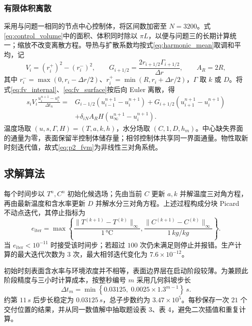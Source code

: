 \documentclass[withoutpreface,bwprint]{cumcmthesis}
\begin{document}
\subsubsection{有限体积离散}

采用与问题一相同的节点中心控制体，将区间数加密至 $N=3200$。式\eqref{eq:control_volume}中的面积、体积同时除以 $\pi L$，以便与问题三的长期计算统一；缩放不改变离散方程。导热与扩散系数均按式\eqref{eq:harmonic_mean}取调和平均，记
\begin{equation}
V_i=(r_i^+)^2-(r_i^-)^2,\qquad
G_{i+1/2}=\frac{2r_{i+1/2}\Gamma_{i+1/2}}{\Delta r},\qquad A_R=2R,
\label{eq:p2_scaled_geometry}
\end{equation}
其中 $r_i^-=\max(0,r_i-\Delta r/2)$、$r_i^+=\min(R,r_i+\Delta r/2)$，$\Gamma$ 取 $k$ 或 $D$。将式\eqref{eq:fv_internal}、\eqref{eq:fv_surface}按后向 Euler 离散，得
\begin{equation}
\begin{aligned}
s_iV_i\frac{u_i^{n+1}-u_i^n}{\Delta t_n}
={}&G_{i-1/2}(u_{i-1}^{n+1}-u_i^{n+1})
+G_{i+1/2}(u_{i+1}^{n+1}-u_i^{n+1})\\
&+\delta_{iN}A_RH(u_\infty^{n+1}-u_i^{n+1}).
\end{aligned}
\label{eq:p2_fvm}
\end{equation}
温度场取 $(u,s,\Gamma,H)=(T,a,k,h)$，水分场取 $(C,1,D,h_m)$。中心缺失界面的通量为零，表面保留半控制体储存量；相邻控制体共享同一界面通量。物性取新时刻迭代值，故式\eqref{eq:p2_fvm}为非线性三对角系统。

\subsection{求解算法}

每个时间步以 $T^n,C^n$ 初始化候选场；先由当前 $C$ 更新 $a,k$ 并解温度三对角方程，再由最新温度和含水率更新 $D$ 并解水分三对角方程。上述过程构成分块 Picard 不动点迭代，其停止指标为
\begin{equation}
e_{\mathrm{iter}}=\max\left\{
\frac{\|T^{(k+1)}-T^{(k)}\|_\infty}{1\,\si{\celsius}},
\frac{\|C^{(k+1)}-C^{(k)}\|_\infty}{1\,\si{kg/kg}}
\right\}.
\label{eq:p2_picard_error}
\end{equation}
当 $e_{\mathrm{iter}}<10^{-11}$ 时接受该时间步；若超过 $100$ 次仍未满足则停止并报错。生产计算的最大迭代次数为 $3$ 次，最大相邻迭代变化为 $7.6\times10^{-12}$。

初始时刻表面含水率与环境浓度并不相等，表面边界层在启动阶段较薄。为兼顾此阶段精度与三小时计算成本，按整秒编号 $m$ 采用几何斜坡步长
\begin{equation}
\Delta t_m=\min\left\{0.03125,\;0.0025\times1.3^{m-1}\right\}\,\si{s}.
\label{eq:p2_ramp_step}
\end{equation}
约第 $11\,\si{s}$ 后步长稳定为 $0.03125\,\si{s}$，总子步数约为 $3.47\times10^5$。每秒保存一次 $21$ 个交付位置的结果，并从同一数值解中抽取题设表 3、表 4，避免二次插值和重复计算。
\end{document}
